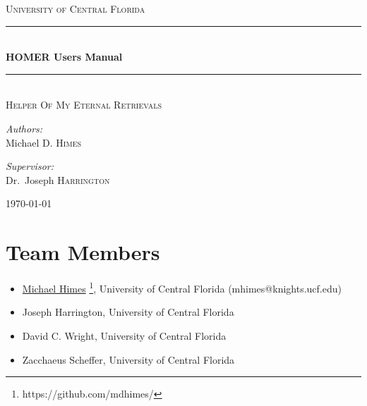 \documentclass[letterpaper, 12pt]{article}
\begin{document}
\begin{titlepage}
\begin{center}

\textsc{\LARGE University of Central Florida}\\[1.5cm]

\rule{\linewidth}{0.5mm} \\[0.4cm]
{ \huge \bfseries HOMER Users Manual \\[0.4cm] }
\rule{\linewidth}{0.5mm} \\[1.0cm]

\textsc{\Large Helper Of My Eternal Retrievals}\\[1.5cm]

\noindent
\begin{minipage}{0.4\textwidth}
\begin{flushleft}
\large
\emph{Authors:} \\
Michael D. \textsc{Himes} \\
\end{flushleft}
\end{minipage}%
\begin{minipage}{0.4\textwidth}
\begin{flushright} \large
\emph{Supervisor:} \\
Dr.~Joseph \textsc{Harrington}
\end{flushright}
\end{minipage}
\vfill

{\large \today}

\end{center}
\end{titlepage}

\tableofcontents
\newpage

\section{Team Members}
\label{sec:team}

\begin{itemize}
\item \href{https://github.com/mdhimes/}{Michael Himes}%
  \footnote{https://github.com/mdhimes/}, University of
  Central Florida (mhimes@knights.ucf.edu)
\item Joseph Harrington, University of Central Florida
\item David C. Wright, University of Central Florida
\item Zacchaeus Scheffer, University of Central Florida
\end{itemize}
\end{document}

